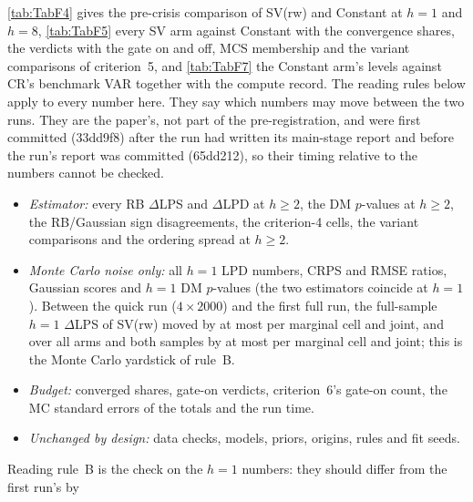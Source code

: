 \cref{tab:TabF4} gives the pre-crisis comparison of SV(rw) and Constant at $h = 1$ and $h = 8$,
\cref{tab:TabF5} every SV arm against Constant with the convergence shares, the verdicts with
the gate on and off, MCS membership and the variant comparisons of criterion~5, and \cref{tab:TabF7} the Constant arm's levels against CR's benchmark VAR together
with the compute record.
The reading rules below apply to every number here.
They say which numbers may move between the two runs. They are the paper's, not part of the
pre-registration, and were first committed (33dd9f8) after the run had written its main-stage
report and before the run's report was committed (65dd212), so their timing relative to the
numbers cannot be checked. %
\begin{itemize}
  \item[A.] \emph{Estimator:} every RB $\Delta$LPS and $\Delta$LPD at $h \geq 2$, the DM $p$-values
    at $h \geq 2$, the RB/Gaussian sign disagreements, the criterion-4 cells, the variant
    comparisons and the ordering spread at $h \geq 2$.
  \item[B.] \emph{Monte Carlo noise only:} all $h = 1$ LPD numbers, CRPS and RMSE ratios, Gaussian
    scores and $h = 1$ DM $p$-values (the two estimators coincide at $h = 1$).
    Between the quick run ($4 \times 2000$) and the first full run, the full-sample $h = 1$
    $\Delta$LPS of SV(rw) moved by at most  per marginal cell and 
    joint, and over all arms and both samples by at most  per marginal cell and
     joint; this is the Monte Carlo yardstick of rule~B.
  \item[C.] \emph{Budget:} converged shares, gate-on verdicts, criterion~6's gate-on count, the MC
    standard errors of the totals and the run time.
  \item[D.] \emph{Unchanged by design:} data checks, models, priors, origins, rules and fit seeds.
\end{itemize}
Reading rule~B is the check on the $h = 1$ numbers: they should differ from the first run's by

